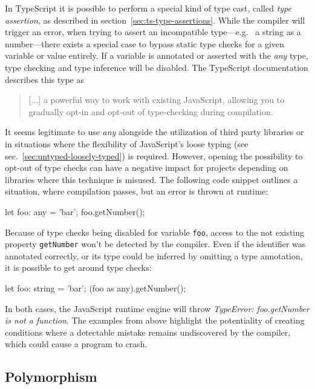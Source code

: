 In TypeScript it is possible to perform a special kind of type cast, called \emph{type assertion}, as described in section~\ref{sec:ts-type-assertions}. While the compiler will trigger an error, when trying to assert an incompatible type---e.g.\  a string as a number---there exists a special case to bypass static type checks for a given variable or value entirely. If a variable is annotated or asserted with the \emph{any} type, type checking and type inference will be disabled. The TypeScript documentation describes this type as 
\begin{quote}
   [...] a powerful way to work with existing JavaScript, allowing you to gradually opt-in and opt-out of type-checking during compilation.~\cite{TypeScriptHandbook:BasicTypes}
\end{quote}
It seems legitimate to use \emph{any} alongside the utilization of third party libraries or in situations where the flexibility of JavaScript's loose typing (see sec.~\ref{sec:untyped-loosely-typed}) is required. However, opening the possibility to opt-out of type checks can have a negative impact for projects depending on libraries where this technique is misused. The following code snippet outlines a situation, where compilation passes, but an error is thrown at runtime:
\begin{JsCode}[numbers=none]
let foo: any = 'bar';
foo.getNumber();
\end{JsCode}
Because of type checks being disabled for variable \texttt{foo}, access to the not existing property \texttt{getNumber} won't be detected by the compiler. Even if the identifier was annotated correctly, or its type could be inferred by omitting a type annotation, it is possible to get around type checks:
\begin{JsCode}[numbers=none]
let foo: string = 'bar';
(foo as any).getNumber();
\end{JsCode}
In both cases, the JavaScript runtime engine will throw \emph{TypeError: foo.getNumber is not a function}. The examples from above highlight the potentiality of creating conditions where a detectable mistake remains undiscovered by the compiler, which could cause a program to crash.

\subsection{Polymorphism}

